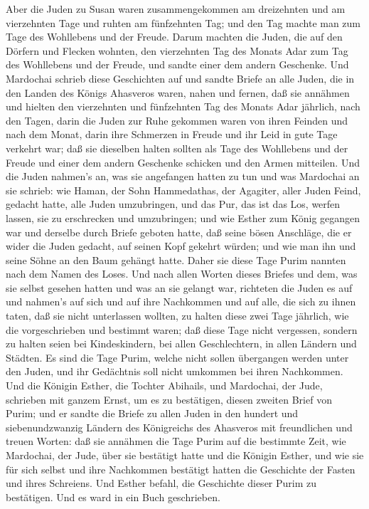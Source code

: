  Aber die Juden zu Susan waren zusammengekommen am
dreizehnten und am vierzehnten Tage und ruhten am fünfzehnten Tag; und
den Tag machte man zum Tage des Wohllebens und der Freude. 
Darum machten die Juden, die auf den Dörfern und Flecken wohnten, den
vierzehnten Tag des Monats Adar zum Tag des Wohllebens und der Freude,
und sandte einer dem andern Geschenke.  Und Mardochai
schrieb diese Geschichten auf und sandte Briefe an alle Juden, die in
den Landen des Königs Ahasveros waren, nahen und fernen, 
daß sie annähmen und hielten den vierzehnten und fünfzehnten Tag des
Monats Adar jährlich,  nach den Tagen, darin die Juden zur
Ruhe gekommen waren von ihren Feinden und nach dem Monat, darin ihre
Schmerzen in Freude und ihr Leid in gute Tage verkehrt war; daß sie
dieselben halten sollten als Tage des Wohllebens und der Freude und
einer dem andern Geschenke schicken und den Armen mitteilen.
 Und die Juden nahmen's an, was sie angefangen hatten zu
tun und was Mardochai an sie schrieb:  wie Haman, der Sohn
Hammedathas, der Agagiter, aller Juden Feind, gedacht hatte, alle Juden
umzubringen, und das Pur, das ist das Los, werfen lassen, sie zu
erschrecken und umzubringen;  und wie Esther zum König
gegangen war und derselbe durch Briefe geboten hatte, daß seine bösen
Anschläge, die er wider die Juden gedacht, auf seinen Kopf gekehrt
würden; und wie man ihn und seine Söhne an den Baum gehängt hatte.
 Daher sie diese Tage Purim nannten nach dem Namen des
Loses. Und nach allen Worten dieses Briefes und dem, was sie selbst
gesehen hatten und was an sie gelangt war,  richteten die
Juden es auf und nahmen's auf sich und auf ihre Nachkommen und auf alle,
die sich zu ihnen taten, daß sie nicht unterlassen wollten, zu halten
diese zwei Tage jährlich, wie die vorgeschrieben und bestimmt waren;
 daß diese Tage nicht vergessen, sondern zu halten seien
bei Kindeskindern, bei allen Geschlechtern, in allen Ländern und
Städten. Es sind die Tage Purim, welche nicht sollen übergangen werden
unter den Juden, und ihr Gedächtnis soll nicht umkommen bei ihren
Nachkommen.  Und die Königin Esther, die Tochter Abihails,
und Mardochai, der Jude, schrieben mit ganzem Ernst, um es zu
bestätigen, diesen zweiten Brief von Purim;  und er sandte
die Briefe zu allen Juden in den hundert und siebenundzwanzig Ländern
des Königreichs des Ahasveros mit freundlichen und treuen Worten:
 daß sie annähmen die Tage Purim auf die bestimmte Zeit,
wie Mardochai, der Jude, über sie bestätigt hatte und die Königin
Esther, und wie sie für sich selbst und ihre Nachkommen bestätigt hatten
die Geschichte der Fasten und ihres Schreiens.  Und Esther
befahl, die Geschichte dieser Purim zu bestätigen. Und es ward in ein
Buch geschrieben.

